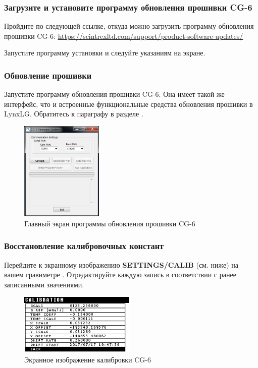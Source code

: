 \subsubsection{Загрузите и установите программу обновления
  прошивки CG-6}

Пройдите по следующей ссылке, откуда можно загрузить программу обновления
прошивки CG-6:
\url{https://scintrexltd.com/support/product-software-updates/}

Запустите программу установки и следуйте указаниям на экране.

\subsubsection{Обновление прошивки}

Запустите программу обновления прошивки CG-6. Она имеет такой же интерфейс, что
и встроенные функциональные средства обновления прошивки в LynxLG. Обратитесь к
параграфу  в разделе
.

\begin{figure}[H]
  \centering
  \includegraphics[width=0.35\textwidth]{figures/cg6_firmware_update_main_screen}
  \caption{Главный экран программы обновления прошивки CG-6}
  \label{fig:cg6_firmware_update_main_screen}
\end{figure}

\subsubsection{Восстановление калибровочных констант}

Перейдите к экранному изображению \textbf{SETTINGS/CALIB} (см. ниже) на вашем
гравиметре \cg{}. Отредактируйте каждую запись в соответствии с ранее записанными
значениями.

\begin{figure}[H]
  \centering
  \includegraphics[width=0.49\textwidth]{figures/the_cg6_calibration_screen}
  \caption{Экранное изображение калибровки CG-6}
  \label{fig:the_cg6_calibration_screen}
\end{figure}

